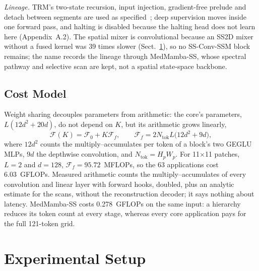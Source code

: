 \documentclass{svproc}
\begin{document}
\emph{Lineage.} TRM's two-state recursion, input injection, gradient-free prelude and detach between segments are used as specified~\cite{trm}; deep supervision moves inside one forward pass, and halting is disabled because the halting head does not learn here (Appendix~A.2). The spatial mixer is convolutional because an SS2D mixer without a fused kernel was 39 times slower (Sect.~\ref{sec:setup}), so no SS-Conv-SSM block remains; the name records the lineage through MedMamba-SS, whose spectral pathway and selective scan are kept, not a spatial state-space backbone.

\subsection{Cost Model}\label{sec:cost}
Weight sharing decouples parameters from arithmetic: the core's parameters, $L(12d^2 + 20d)$, do not depend on $K$, but its arithmetic grows linearly,
\begin{equation}
\mathcal{F}(K) = \mathcal{F}_0 + K \mathcal{F}_f, \qquad \mathcal{F}_f = 2 N_{\text{tok}} L \big(12 d^2 + 9 d\big),
\label{eq:cost}
\end{equation}
where $12d^2$ counts the multiply--accumulates per token of a block's two GEGLU MLPs, $9d$ the depthwise convolution, and $N_{\text{tok}} = H_p W_p$. For 11$\times$11 patches, $L = 2$ and $d = 128$, $\mathcal{F}_f = 95.72$~MFLOPs, so the 63 applications cost 6.03~GFLOPs. Measured arithmetic counts the multiply--accumulates of every convolution and linear layer with forward hooks, doubled, plus an analytic estimate for the scans, without the reconstruction decoder; it says nothing about latency. MedMamba-SS costs 0.278~GFLOPs on the same input: a hierarchy reduces its token count at every stage, whereas every core application pays for the full 121-token grid.

\section{Experimental Setup}\label{sec:setup}
\end{document}
